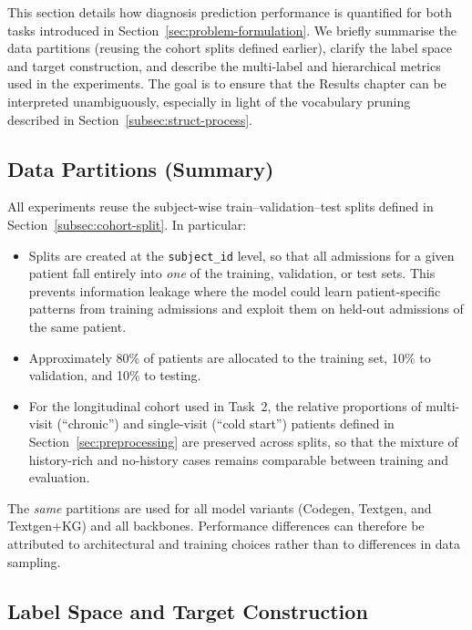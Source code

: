 This section details how diagnosis prediction performance is quantified for both tasks introduced in Section~\ref{sec:problem-formulation}. We briefly summarise the data partitions (reusing the cohort splits defined earlier), clarify the label space and target construction, and describe the multi-label and hierarchical metrics used in the experiments. The goal is to ensure that the Results chapter can be interpreted unambiguously, especially in light of the vocabulary pruning described in Section~\ref{subsec:struct-process}.

\subsection{Data Partitions (Summary)}
\label{subsec:evaluation-splits}

All experiments reuse the subject-wise train--validation--test splits defined in Section~\ref{subsec:cohort-split}. In particular:

\begin{itemize}
    \item Splits are created at the \texttt{subject\_id} level, so that all admissions for a given patient fall entirely into \emph{one} of the training, validation, or test sets. This prevents information leakage where the model could learn patient-specific patterns from training admissions and exploit them on held-out admissions of the same patient.
    \item Approximately 80\% of patients are allocated to the training set, 10\% to validation, and 10\% to testing.
    \item For the longitudinal cohort used in Task~2, the relative proportions of multi-visit (``chronic'') and single-visit (``cold start'') patients defined in Section~\ref{sec:preprocessing} are preserved across splits, so that the mixture of history-rich and no-history cases remains comparable between training and evaluation.
\end{itemize}

The \emph{same} partitions are used for all model variants (Codegen, Textgen, and Textgen+KG) and all backbones. Performance differences can therefore be attributed to architectural and training choices rather than to differences in data sampling.

\subsection{Label Space and Target Construction}
\label{subsec:label-space}

